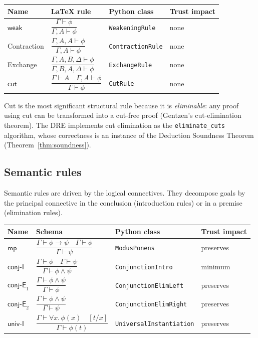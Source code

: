 \documentclass[11pt]{article}
\newcommand{\Prov}[2]{#1 \vdash #2}           %
\newcommand{\MP}{\mathsf{mp}}                 %
\newcommand{\WeakR}{\ensuremath{\mathsf{weak}}}            %
\newcommand{\ConjI}{\mathsf{conj\text{-}I}}   %
\newcommand{\ConjE}{\mathsf{conj\text{-}E}}   %
\newcommand{\UnivI}{\mathsf{univ\text{-}I}}   %
\newcommand{\CutR}{\ensuremath{\mathsf{cut}}}              %
\begin{document}
\begin{center}
\begin{tabular}{llll}
  \toprule
  Name & LaTeX rule & Python class & Trust impact \\
  \midrule
  \WeakR    & $\dfrac{\Prov{\Gamma}{\phi}}{\Prov{\Gamma, A}{\phi}}$ &
              \lstinline|WeakeningRule| & none \\[8pt]
  Contraction & $\dfrac{\Prov{\Gamma, A, A}{\phi}}{\Prov{\Gamma, A}{\phi}}$ &
              \lstinline|ContractionRule| & none \\[8pt]
  Exchange & $\dfrac{\Prov{\Gamma, A, B, \Delta}{\phi}}
                    {\Prov{\Gamma, B, A, \Delta}{\phi}}$ &
              \lstinline|ExchangeRule| & none \\[8pt]
  \CutR    & $\dfrac{\Prov{\Gamma}{A}\quad \Prov{\Gamma, A}{\phi}}
                    {\Prov{\Gamma}{\phi}}$ &
              \lstinline|CutRule| & none \\
  \bottomrule
\end{tabular}
\end{center}

\noindent
Cut is the most significant structural rule because it is
\emph{eliminable}: any proof using cut can be transformed into a
cut-free proof (Gentzen's cut-elimination theorem).  The \textsc{DRE}
implements cut elimination as the \lstinline|eliminate_cuts| algorithm,
whose correctness is an instance of the Deduction Soundness Theorem
(Theorem~\ref{thm:soundness}).

\subsection{Semantic rules}

Semantic rules are driven by the logical connectives.  They decompose
goals by the principal connective in the conclusion (introduction rules)
or in a premise (elimination rules).

\begin{center}
\begin{tabular}{llll}
  \toprule
  Name & Schema & Python class & Trust impact \\
  \midrule
  $\MP$ &
    $\dfrac{\Prov{\Gamma}{\phi \to \psi}\quad \Prov{\Gamma}{\phi}}
           {\Prov{\Gamma}{\psi}}$ &
    \lstinline|ModusPonens| & preserves \\[10pt]
  $\ConjI$ &
    $\dfrac{\Prov{\Gamma}{\phi}\quad \Prov{\Gamma}{\psi}}
           {\Prov{\Gamma}{\phi \wedge \psi}}$ &
    \lstinline|ConjunctionIntro| & minimum \\[10pt]
  $\ConjE_1$ &
    $\dfrac{\Prov{\Gamma}{\phi \wedge \psi}}
           {\Prov{\Gamma}{\phi}}$ &
    \lstinline|ConjunctionElimLeft| & preserves \\[10pt]
  $\ConjE_2$ &
    $\dfrac{\Prov{\Gamma}{\phi \wedge \psi}}
           {\Prov{\Gamma}{\psi}}$ &
    \lstinline|ConjunctionElimRight| & preserves \\[10pt]
  $\UnivI$ &
    $\dfrac{\Prov{\Gamma}{\forall x.\, \phi(x)}\quad [t/x]}
           {\Prov{\Gamma}{\phi(t)}}$ &
    \lstinline|UniversalInstantiation| & preserves \\
  \bottomrule
\end{tabular}
\end{center}
\end{document}
